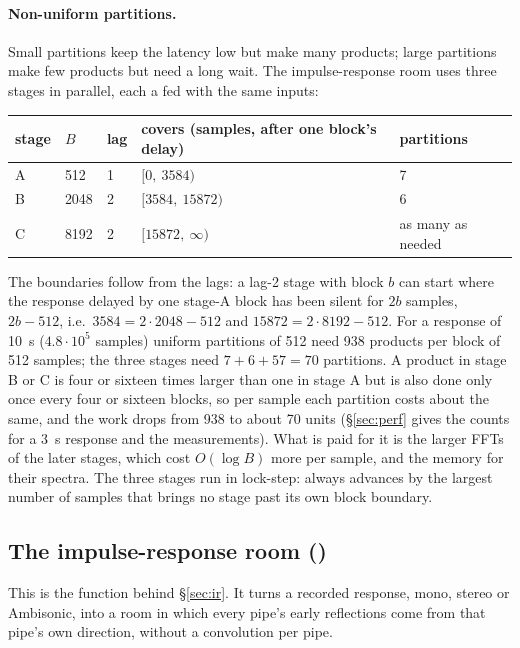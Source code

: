 \paragraph{Non-uniform partitions.} Small partitions keep the latency low but make many products; large partitions
make few products but need a long wait. The impulse-response room uses three stages in parallel, each a
 fed with the same inputs:
\begin{center}
\begin{tabular}{@{}lllll@{}}
\toprule
stage & $B$ & lag & covers (samples, after one block's delay) & partitions \\
\midrule
A & 512 & 1 & $[0,\ 3584)$ & 7 \\
B & 2048 & 2 & $[3584,\ 15872)$ & 6 \\
C & 8192 & 2 & $[15872,\ \infty)$ & as many as needed \\
\bottomrule
\end{tabular}
\end{center}
The boundaries follow from the lags: a lag-2 stage with block $b$ can start where the response delayed by one
stage-A block has been silent for $2b$ samples, $2b - 512$, i.e.\ $3584 = 2\cdot2048-512$ and $15872 = 2\cdot 8192 - 512$.
For a response of \SI{10}{s} ($4.8\cdot10^5$ samples) uniform partitions of 512 need 938 products per block of 512
samples; the three stages need $7+6+57 = 70$ partitions. A product in stage B or C is four or sixteen times larger
than one in stage A but is also done only once every four or sixteen blocks, so per sample each partition costs about
the same, and the work drops from 938 to about 70 units (\S\ref{sec:perf} gives the counts for a \SI{3}{s} response
and the measurements). What is paid for it is the larger FFTs of the later stages, which cost
$O(\log B)$ more per sample, and the memory for their spectra. The three stages run in lock-step:  always advances by the
largest number of samples that brings no stage past its own block boundary.

\subsection{The impulse-response room ()}
\label{sec:math-ir}
This is the function behind \S\ref{sec:ir}. It turns a recorded response, mono, stereo or Ambisonic, into a room in
which every pipe's early reflections come from that pipe's own direction, without a convolution per pipe.

